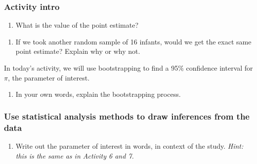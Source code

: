 \documentclass[
]{report}
\providecommand{\tightlist}{%
  \setlength{\itemsep}{0pt}\setlength{\parskip}{0pt}}
\begin{document}
\subsubsection*{Activity intro}\label{activity-intro}

\begin{enumerate}
\def\labelenumi{\arabic{enumi}.}
\tightlist
\item
  What is the value of the point estimate?
\end{enumerate}

\vspace{0.3in}

\begin{enumerate}
\def\labelenumi{\arabic{enumi}.}
\setcounter{enumi}{1}
\tightlist
\item
  If we took another random sample of 16 infants, would we get the exact same point estimate? Explain why or why not.
\end{enumerate}

\vspace{0.5in}

In today's activity, we will use bootstrapping to find a 95\% confidence interval for \(\pi\), the parameter of interest.

\begin{enumerate}
\def\labelenumi{\arabic{enumi}.}
\setcounter{enumi}{2}
\tightlist
\item
  In your own words, explain the bootstrapping process.
  \vspace{0.5in}
\end{enumerate}

\subsubsection*{Use statistical analysis methods to draw inferences from the data}\label{use-statistical-analysis-methods-to-draw-inferences-from-the-data-1}

\begin{enumerate}
\def\labelenumi{\arabic{enumi}.}
\setcounter{enumi}{3}
\tightlist
\item
  Write out the parameter of interest in words, in context of the study. \emph{Hint: this is the same as in Activity 6 and 7.}
\end{enumerate}

\vspace{0.5in}
\end{document}
